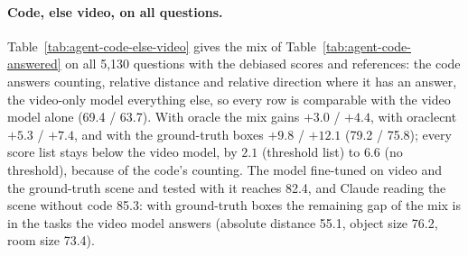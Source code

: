 \paragraph{Code, else video, on all questions.}
Table~\ref{tab:agent-code-else-video} gives the mix of Table~\ref{tab:agent-code-answered} on all 5,130
questions with the debiased scores and references: the code answers counting, relative distance and relative direction
where it has an answer, the video-only model everything else, so every row is comparable with the video model alone
(69.4 / 63.7). With oracle the mix gains $+3.0$ / $+4.4$, with oraclecnt $+5.3$ / $+7.4$, and with the ground-truth
boxes $+9.8$ / $+12.1$ (79.2 / 75.8); every score list stays below the video model, by $2.1$ (threshold list) to $6.6$ (no
threshold), because of the code's counting. The model fine-tuned on video and the ground-truth scene and tested with it
reaches 82.4, and Claude reading the scene without code 85.3: with ground-truth boxes the remaining gap of the mix is in
the tasks the video model answers (absolute distance 55.1, object size 76.2, room size 73.4).

